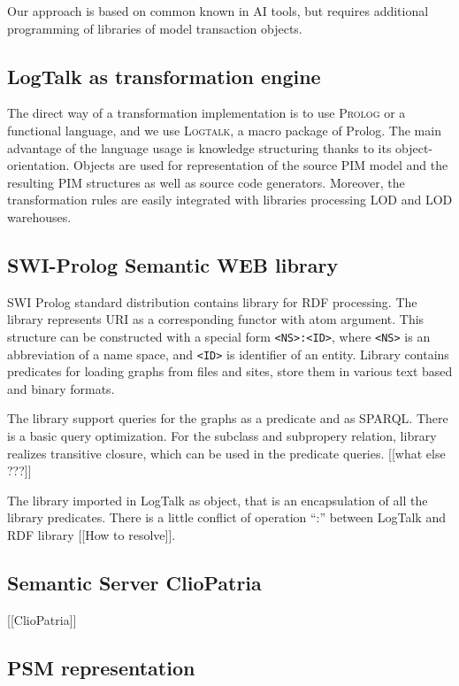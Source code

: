 \documentclass[12pt,a4paper]{llncs}
\begin{document}
Our approach is based on common known in AI tools, but requires additional programming of libraries of model transaction objects.

\subsection{LogTalk as transformation engine}
\label{sec:logtalk-engine}

The direct way of a transformation implementation is to use \textsc{Prolog} or a functional language, and we use \textsc{Logtalk}, a macro package of Prolog.  The main advantage of the language usage is knowledge structuring thanks to its object-orientation.  Objects are used for representation of the source PIM model and the resulting PIM structures as well as source code generators.  Moreover, the transformation rules are easily integrated with libraries processing LOD and LOD warehouses.


\subsection{SWI-Prolog Semantic WEB library}
\label{sec:swi-sw}

SWI Prolog standard distribution contains library for RDF processing.  The library represents URI as a corresponding functor with atom argument. This structure can be constructed with a special form \texttt{<NS>:<ID>}, where \texttt{<NS>} is an abbreviation of a name space, and \texttt{<ID>} is identifier of an entity.  Library contains predicates for loading graphs from files and sites, store them in various text based and binary formats.

The library support queries for the graphs as a predicate and as SPARQL.  There is a basic query optimization.  For the subclass and subpropery relation, library realizes transitive closure, which can be used in the predicate queries.  [[what else ???]]

The library imported in LogTalk as object, that is an encapsulation of all the library predicates.  There is a little conflict of operation ``:'' between LogTalk and RDF library [[How to resolve]].

\subsection{Semantic Server ClioPatria}
\label{sec:clio-descr}
[[ClioPatria]]

\subsection{PSM representation}
\label{sec:blocks}
\end{document}
